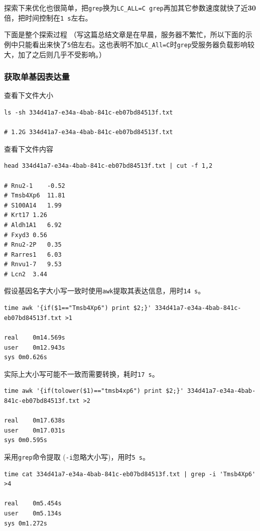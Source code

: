 \documentclass[]{article}
\numberwithin{figure}{section}
\numberwithin{table}{section}
\begin{document}
探索下来优化也很简单，把\texttt{grep}换为\texttt{LC\_ALL=C\ grep}再加其它参数速度就快了近\textbf{30}倍，把时间控制在\texttt{1\ s}左右。

下面是整个探索过程 （写这篇总结文章是在早晨，服务器不繁忙，所以下面的示例中只能看出来快了\texttt{5}倍左右。这也表明不加\texttt{LC\_All=C}时\texttt{grep}受服务器负载影响较大，加了之后则几乎不受影响。）

\hypertarget{grep_single_gene}{%
\subsubsection{获取单基因表达量}\label{grep_single_gene}}

查看下文件大小

\begin{verbatim}
ls -sh 334d41a7-e34a-4bab-841c-eb07bd84513f.txt

# 1.2G 334d41a7-e34a-4bab-841c-eb07bd84513f.txt
\end{verbatim}

查看下文件内容

\begin{verbatim}
head 334d41a7-e34a-4bab-841c-eb07bd84513f.txt | cut -f 1,2

# Rnu2-1	-0.52
# Tmsb4Xp6	11.81
# S100A14	1.99
# Krt17	1.26
# Aldh1A1	6.92
# Fxyd3	0.56
# Rnu2-2P	0.35
# Rarres1	6.03
# Rnvu1-7	9.53
# Lcn2	3.44
\end{verbatim}

假设基因名字大小写一致时使用\texttt{awk}提取其表达信息，用时\texttt{14\ s}。

\begin{verbatim}
time awk '{if($1=="Tmsb4Xp6") print $2;}' 334d41a7-e34a-4bab-841c-eb07bd84513f.txt >1

real	0m14.569s
user	0m12.943s
sys	0m0.626s
\end{verbatim}

实际上大小写可能不一致而需要转换，耗时\texttt{17\ s}。

\begin{verbatim}
time awk '{if(tolower($1)=="tmsb4xp6") print $2;}' 334d41a7-e34a-4bab-841c-eb07bd84513f.txt >2

real	0m17.638s
user	0m17.031s
sys	0m0.595s
\end{verbatim}

采用\texttt{grep}命令提取 (\texttt{-i}忽略大小写)，用时\texttt{5\ s}。

\begin{verbatim}
time cat 334d41a7-e34a-4bab-841c-eb07bd84513f.txt | grep -i 'Tmsb4Xp6' >4

real	0m5.454s
user	0m5.134s
sys	0m1.272s
\end{verbatim}
\end{document}
